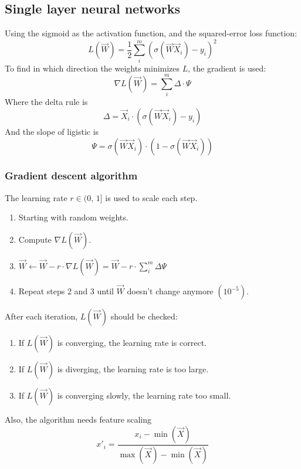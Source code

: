 \documentclass[11pt]{article}
\begin{document}
\subsection{Single layer neural networks}
\label{sec:org3b25afb}
Using the sigmoid as the activation function, and the squared-error loss function:
\[
  L(\vec{W}) = \frac{1}{2} \sum_i^m \left( \sigma\left(\vec{W} \vec{X}_i\right) - y_i \right)^2
\]
To find in which direction the weights minimizes \(L\), the gradient is used:
\[
  \nabla L(\vec{W}) = \sum_i^m \Delta \cdot \Psi
\]
Where the delta rule is
\[
  \Delta = \vec{X}_i \cdot \left( \sigma\left(\vec{W}\vec{X}_i\right) - y_i \right)
\]
And the slope of ligistic is
\[
  \Psi = \sigma\left(\vec{W}\vec{X}_i\right) \cdot \left(1 - \sigma\left(\vec{W}\vec{X}_i\right)\right)
\]
\newpage
\subsubsection{Gradient descent algorithm}
\label{sec:org56616c8}
The learning rate \(r \in (0,\, 1]\) is used to scale each step.
\begin{enumerate}
\item Starting with random weights.
\item Compute \(\nabla L(\vec{W})\).
\item \(\vec{W} \leftarrow \vec{W} - r \cdot \nabla L(\vec{W}) = \vec{W} - r \cdot \sum\limits_i^m \Delta \Psi\)
\item Repeat steps 2 and 3 until \(\vec{W}\) doesn't change anymore \((10^{-5})\).
\end{enumerate}
After each iteration, \(L(\vec{W})\) should be checked:
\begin{enumerate}
\item If \(L(\vec{W})\) is converging, the learning rate is correct.
\item If \(L(\vec{W})\) is diverging, the learning rate is too large.
\item If \(L(\vec{W})\) is converging slowly, the learning rate too small.
\end{enumerate}
Also, the algorithm needs feature scaling
\[
  x'_i = \frac{x_i - \min(\vec{X})}{\max(\vec{X}) - \min(\vec{X})}
\]
\end{document}
